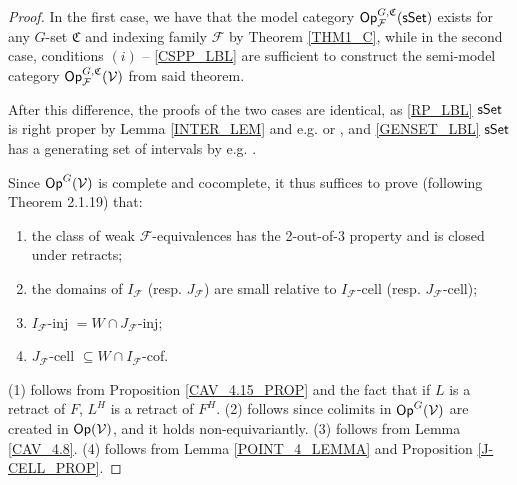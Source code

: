 \documentclass[a4paper,10pt
,draft
]{article}%
\renewcommand{\F}{\mathcal F}
\renewcommand{\1}{\ensuremath{\mathbb{id}}}
\begin{document}
\begin{proof}
      In the first case, we have that the model category $\Op^{G,\mathfrak C}_\F(\sSet)$ exists
      for any $G$-set $\mathfrak C$ and indexing family $\F$ by Theorem \ref{THM1_C},
      while in the second case, conditions $(i)$ -- \ref{CSPP_LBL} are sufficient to construct the
      semi-model category $\Op^{G, \mathfrak C}_\F(\V)$ from said theorem.
      
      After this difference, the proofs of the two cases are identical, as
      \ref{RP_LBL} $\mathsf{sSet}$ is right proper
      by Lemma \ref{INTER_LEM} and e.g. \cite[Prop 2.1.5]{Cis06} or \cite[Lemma 1.12]{BM13}, and
      \ref{GENSET_LBL} $\mathsf{sSet}$ has a generating set of intervals
      by e.g. \cite[Lemma 1.12]{BM13}.

      Since $\mathsf{Op}^G(\mathcal V)$ is complete and cocomplete, it thus suffices to prove (following \cite{Hov98} Theorem 2.1.19) that:
      \begin{enumerate}[label = (\arabic*)]
      \item the class of weak $\F$-equivalences has the 2-out-of-3 property and is closed under retracts;
      \item the domains of $I_{\F}$ (resp. $J_{\F}$) are small relative to $I_{\F}$-cell (resp. $J_{\F}$-cell);
      \item $I_{\F}$-inj $= W\cap J_{\F}$-inj;
      \item $J_{\F}$-cell $\subseteq W\cap I_{\F}$-cof.
      \end{enumerate}
      (1) follows from Proposition \ref{CAV_4.15_PROP} and the fact that if $L$ is a retract of $F$, $L^H$ is a retract of $F^H$.
      (2) follows since colimits in $\mathsf{Op}^G(\mathcal V)$ are created in $\mathsf{Op}(\mathcal V)$, and it holds non-equivariantly.
      (3) follows from Lemma \ref{CAV_4.8}.
      (4) follows from Lemma \ref{POINT_4_LEMMA} and Proposition \ref{J-CELL_PROP}.
\end{proof}

\end{document}
